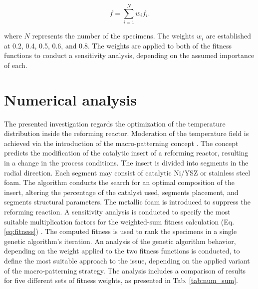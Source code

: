 \documentclass[preprint,12pt]{elsarticle}
\begin{document}
\begin{equation}
\label{eq:fitness}
f = \sum_{i = 1}^{N} w_{i}f_{i}.
\end{equation}

\noindent where $N$ represents the number of the specimens. The weights $w_{i}$ are established at 0.2, 0.4, 0.5, 0.6, and 0.8. The weights are applied to both of the fitness functions to conduct a sensitivity analysis, depending on the assumed importance of each. 
\clearpage






\section{Numerical analysis}
\label{sec:num_analysis}

The presented investigation regards the optimization of the temperature distribution inside the reforming reactor. Moderation of the temperature field is achieved via the introduction of the macro-patterning concept \cite{Pajak2018}. The concept predicts the modification of the catalytic insert of a reforming reactor, resulting in a change in the process conditions. The insert is divided into segments in the radial direction. Each segment may consist of catalytic Ni/YSZ or stainless steel foam. The algorithm conducts the search for an optimal composition of the insert, altering the percentage of the catalyst used, segments placement, and segments structural parameters.  The metallic foam is introduced to suppress the reforming reaction. A sensitivity analysis is conducted to specify the most suitable multiplication factors for the weighted-sum fitness calculation (Eq. \eqref{eq:fitness}) \cite{Davahli2022}. The computed fitness is used to rank the specimens in a single genetic algorithm's iteration. An analysis of the genetic algorithm behavior, depending on the weight applied to the two fitness functions is conducted, to define the most suitable approach to the issue, depending on the applied variant of the macro-patterning strategy. The analysis includes a comparison of results for five different sets of fitness weights, as presented in Tab. \ref{tab:num_sum}.
\end{document}

